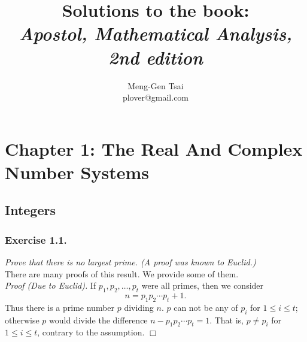\documentclass{article}
\title{\textbf{Solutions to the book: \\\emph{Apostol, Mathematical Analysis, 2nd edition}}}
\author{Meng-Gen Tsai \\ plover@gmail.com}
\begin{document}
\maketitle
\tableofcontents












\newpage
\section*{Chapter 1: The Real And Complex Number Systems \\}



\subsection*{Integers \\}



\subsubsection*{Exercise 1.1.}
\emph{Prove that there is no largest prime. (A proof was known to Euclid.)} \\

There are many proofs of this result. We provide some of them. \\

\emph{Proof (Due to Euclid).}
If
$p_1, p_2, \ldots, p_t$ were all primes, then
we consider $$n = p_1 p_2 \cdots p_t + 1.$$
Thus there is a prime number $p$ dividing $n$.
$p$ can not be any of $p_i$ for $1 \leq i \leq t$;
otherwise $p$ would divide the difference $n - p_1 p_2 \cdots p_t = 1$.
That is, $p \neq p_i$ for $1 \leq i \leq t$,
contrary to the assumption.
$\Box$ \\
\end{document}
